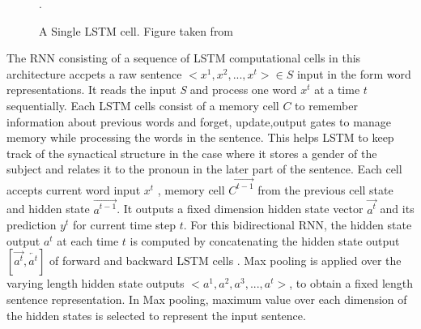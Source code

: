 \documentclass[12pt]{report} %
\begin{document}
	
	\begin{figure}[!tbp]
		\centering
		\caption{A Single LSTM cell. Figure taken from \cite{SeqMod2018Andrew}}.
		\label{lstm}
	\end{figure}
	
	 The RNN consisting of a sequence of LSTM computational cells in this architecture accpets a raw sentence $<x^{1},x^{2},...,x^{t}> \in S$ input in the form word representations. It reads the input \textit{S} and process one word $x^{t}$ at a time $t$ sequentially. Each LSTM cells consist of a memory cell $C$ to remember information about previous words and forget, update,output gates to manage memory while processing the words in the sentence. This helps LSTM to keep track of the synactical structure in the case where it stores a gender of the subject and relates it to the pronoun in the later part of the sentence. Each cell accepts current word input $x^{t}$ , memory cell $\overrightarrow{C^{t-1}}$ from the previous cell state and hidden state $\overrightarrow{a^{t-1}}$. It outputs a fixed dimension hidden state vector $\overrightarrow{a^{t}}$ and its prediction $y^{t}$ for current time step $t$. For this bidirectional RNN, the hidden state output $ a^{t} $ at each time $ t $ is computed by concatenating the hidden state output $ [\overrightarrow{a^{t}},\overleftarrow{a^{t}}] $ of forward  and backward LSTM cells . Max pooling is applied over the varying length hidden state outputs $<a^{1},a^{2},a^{3},...,a^{t}> $, to obtain a fixed length sentence representation. In Max pooling, maximum value over each dimension of the hidden states is selected to represent the input sentence.
	
\end{document}
